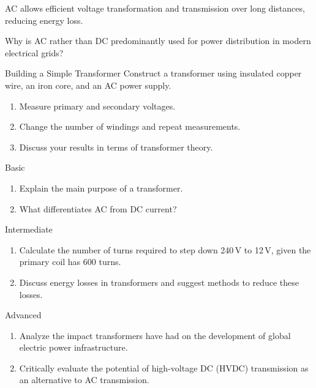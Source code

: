 
AC allows efficient voltage transformation and transmission over long distances, reducing energy loss.

\begin{stopandthink}
Why is AC rather than DC predominantly used for power distribution in modern electrical grids?
\end{stopandthink}

\begin{investigation}{Building a Simple Transformer}
Construct a transformer using insulated copper wire, an iron core, and an AC power supply.
\begin{enumerate}
    \item Measure primary and secondary voltages.
    \item Change the number of windings and repeat measurements.
    \item Discuss your results in terms of transformer theory.
\end{enumerate}
\end{investigation}

\begin{tieredquestions}{Basic}
\begin{enumerate}
    \item Explain the main purpose of a transformer.
    \item What differentiates AC from DC current?
\end{enumerate}
\end{tieredquestions}

\begin{tieredquestions}{Intermediate}
\begin{enumerate}
    \item Calculate the number of turns required to step down 240\,V to 12\,V, given the primary coil has 600 turns.
    \item Discuss energy losses in transformers and suggest methods to reduce these losses.
\end{enumerate}
\end{tieredquestions}

\begin{tieredquestions}{Advanced}
\begin{enumerate}
    \item Analyze the impact transformers have had on the development of global electric power infrastructure.
    \item Critically evaluate the potential of high-voltage DC (HVDC) transmission as an alternative to AC transmission.
\end{enumerate}
\end{tieredquestions}

